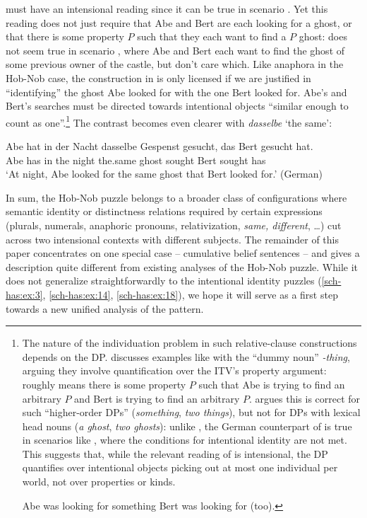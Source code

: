 \documentclass[output=paper]{langscibook}
\begin{document}
\noindent {} must have an intensional reading since it can be true in scenario . Yet this reading does not just require that Abe and Bert are each looking for a ghost, or that there is some property $P$ such that they each want to find a $P$ ghost:  does not seem true in scenario , where Abe and Bert each want to find the ghost of some previous owner of the castle, but don't care which. Like anaphora in the Hob-Nob case, the construction in  is only licensed if we are justified in ``identifying'' the ghost Abe looked for with the one Bert looked for. Abe's and Bert's searches must be directed towards intentional objects ``similar enough to count as one''.\footnote{The nature of the individuation problem in such relative-clause constructions depends on the DP. \citet{Zimmermann:2006} discusses examples like  with the ``dummy noun'' \textit{-thing}, arguing they involve quantification over the ITV's property argument:  roughly means there is some property $P$ such that Abe is trying to find an arbitrary $P$ and Bert is trying to find an arbitrary $P$. \citet{Haslinger:2019} argues this is correct for such ``higher-order DPs'' (\textit{something}, \textit{two things}), but not for DPs with lexical head nouns (\textit{a ghost}, \textit{two ghosts}): unlike , the German counterpart of  is true in scenarios like , where the conditions for intentional identity are not met. This suggests that, while the relevant reading of  is intensional, the DP quantifies over intentional objects picking out at most one individual per world, not over properties or kinds.

\ea \label{sch-has:ex:16} Abe was looking for something Bert was looking for (too). \z


} The contrast becomes even clearer with \textit{dasselbe} `the same':

\ea \label{sch-has:ex:18} {\gll Abe hat in der Nacht dasselbe Gespenst gesucht, das Bert gesucht hat. \\
Abe has in the night the.same ghost sought \REL{} Bert sought has \\
\glt `At night, Abe looked for the same ghost that Bert looked for.'} \hfill (German) \z

\noindent In sum, the Hob-Nob puzzle belongs to a broader class of configurations where semantic identity or distinctness relations required by certain expressions (plurals, numerals, anaphoric pronouns, relativization, \textit{same, different}, \ldots) cut across two intensional contexts with different subjects. The remainder of this paper concentrates on one special case -- cumulative belief sentences -- and gives a description quite different from existing analyses of the Hob-Nob puzzle. While it does not generalize straightforwardly to the intentional identity puzzles (\ref{sch-has:ex:3}, \ref{sch-has:ex:14}, \ref{sch-has:ex:18}), we hope it will serve as a first step towards a new unified analysis of the pattern.
\end{document}
